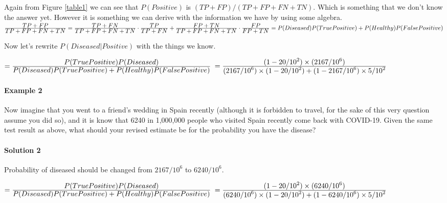\documentclass[12pt]{article}
\begin{document}
Again from Figure \ref{table1} we can see that $P(Positive)$ is $(TP + FP)/(TP + FP + FN + TN)$. 
Which is something that we don't know the answer yet. 
However it is something we can derive with the information we have by using some algebra.\\

\begin{math}
 \ddfrac{TP + FP}{TP + FP + FN + TN} = \\\\
 \ddfrac{TP + FN}{TP + FP + FN + TN}\cdot\ddfrac{TP}{TP + FN} +
 \ddfrac{FP + TN}{TP + FP + FN + TN}\cdot\ddfrac{FP}{FP + TN} \\\newline
= P(Diseased)P(True Positive) + P(Healthy)P(False Positive)
\end{math}

\pagebreak
Now let's rewrite $P(Diseased|Positive)$ with the things we know.\\
\begin{center}
    $ =\frac{\displaystyle P(True Positive)P(Diseased)}{\displaystyle P(Diseased)P(True Positive) + P(Healthy)P(False Positive)}$
    \newline
    \newline
    $=\frac{\displaystyle (1 - 20/10^2)\times(2167/10^6)}{\displaystyle (2167/10^6)\times(1 - 20/10^2)+ (1 - 2167/10^6)\times5/10^2}$
\end{center}

\paragraph{Example 2}
Now imagine that you went to a friend’s wedding in Spain recently (although it is forbidden to travel, for the sake of this very question assume you did so), and it is know that 6240 in 1,000,000 people who visited Spain recently come back with COVID-19. Given the same test result as above, what should your revised estimate be for the probability you have the disease?

\paragraph{Solution 2}
Probability of diseased should be changed from \(2167/10^6\) to \(6240/10^6\).
\begin{center}
    $ =\frac{\displaystyle P(True Positive)P(Diseased)}{\displaystyle P(Diseased)P(True Positive) + P(Healthy)P(False Positive)}$
    \newline
    \newline
    $=\frac{\displaystyle (1 - 20/10^2)\times(6240/10^6)}{\displaystyle (6240/10^6)\times(1 - 20/10^2)+ (1 - 6240/10^6)\times5/10^2}$
\end{center}
\end{document}
